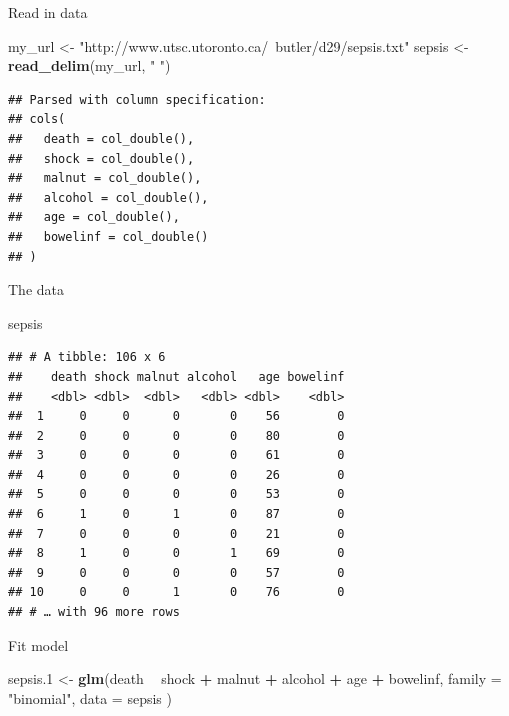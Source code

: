 \documentclass[ignorenonframetext,]{beamer}
\newenvironment{Shaded}{\begin{snugshade}}{\end{snugshade}}
\newcommand{\DataTypeTok}[1]{\textcolor[rgb]{0.13,0.29,0.53}{#1}}
\newcommand{\FloatTok}[1]{\textcolor[rgb]{0.00,0.00,0.81}{#1}}
\newcommand{\KeywordTok}[1]{\textcolor[rgb]{0.13,0.29,0.53}{\textbf{#1}}}
\newcommand{\NormalTok}[1]{#1}
\newcommand{\OperatorTok}[1]{\textcolor[rgb]{0.81,0.36,0.00}{\textbf{#1}}}
\newcommand{\StringTok}[1]{\textcolor[rgb]{0.31,0.60,0.02}{#1}}
\begin{document}
\begin{frame}[fragile]{Read in data}
\protect\hypertarget{read-in-data}{}

\begin{Shaded}
\begin{Highlighting}[]
\NormalTok{my_url <-}\StringTok{ }
\StringTok{  "http://www.utsc.utoronto.ca/~butler/d29/sepsis.txt"}
\NormalTok{sepsis <-}\StringTok{ }\KeywordTok{read_delim}\NormalTok{(my_url, }\StringTok{" "}\NormalTok{)}
\end{Highlighting}
\end{Shaded}

\begin{verbatim}
## Parsed with column specification:
## cols(
##   death = col_double(),
##   shock = col_double(),
##   malnut = col_double(),
##   alcohol = col_double(),
##   age = col_double(),
##   bowelinf = col_double()
## )
\end{verbatim}

\end{frame}

\begin{frame}[fragile]{The data}
\protect\hypertarget{the-data-2}{}

\begin{Shaded}
\begin{Highlighting}[]
\NormalTok{sepsis}
\end{Highlighting}
\end{Shaded}

\begin{verbatim}
## # A tibble: 106 x 6
##    death shock malnut alcohol   age bowelinf
##    <dbl> <dbl>  <dbl>   <dbl> <dbl>    <dbl>
##  1     0     0      0       0    56        0
##  2     0     0      0       0    80        0
##  3     0     0      0       0    61        0
##  4     0     0      0       0    26        0
##  5     0     0      0       0    53        0
##  6     1     0      1       0    87        0
##  7     0     0      0       0    21        0
##  8     1     0      0       1    69        0
##  9     0     0      0       0    57        0
## 10     0     0      1       0    76        0
## # … with 96 more rows
\end{verbatim}

\end{frame}

\begin{frame}[fragile]{Fit model}
\protect\hypertarget{fit-model}{}

\begin{Shaded}
\begin{Highlighting}[]
\NormalTok{sepsis}\FloatTok{.1}\NormalTok{ <-}\StringTok{ }\KeywordTok{glm}\NormalTok{(death }\OperatorTok{~}\StringTok{ }\NormalTok{shock }\OperatorTok{+}\StringTok{ }\NormalTok{malnut }\OperatorTok{+}\StringTok{ }\NormalTok{alcohol }\OperatorTok{+}\StringTok{ }\NormalTok{age }\OperatorTok{+}
\StringTok{  }\NormalTok{bowelinf,}
\DataTypeTok{family =} \StringTok{"binomial"}\NormalTok{,}
\DataTypeTok{data =}\NormalTok{ sepsis}
\NormalTok{)}
\end{Highlighting}
\end{Shaded}

\end{frame}
\end{document}
